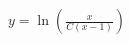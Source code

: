 \documentclass[preview]{standalone}
\begin{document}
\begin{align*}
y = \ln \left( \frac{x}{C(x-1)} \right)
\end{align*}
\end{document}
